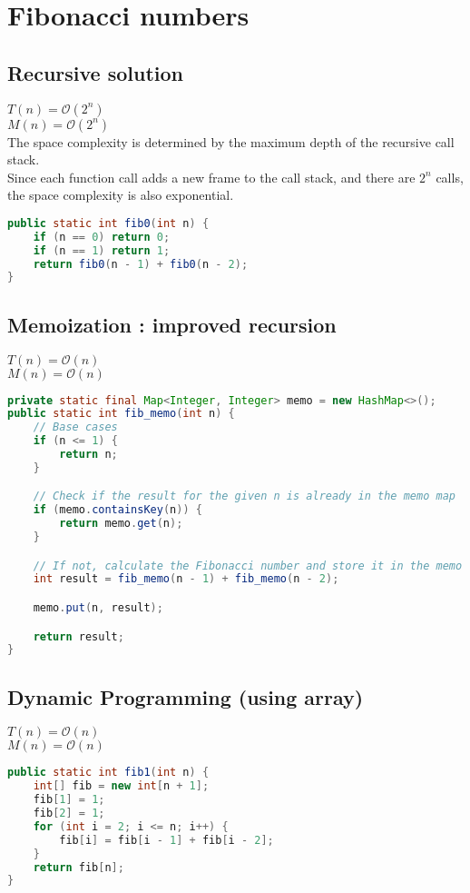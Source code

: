 \documentclass{article}
\begin{document}
\section{Fibonacci numbers}
\subsection{Recursive solution}
$T(n) = \mathcal{O}(2^{n})$ \\
$M(n) = \mathcal{O}(2^{n})$ \\
The space complexity is determined by the maximum depth of the recursive call stack.\\
Since each function call adds a new frame to the call stack, and there are $2^n$ calls, the space complexity is also exponential.\\
\begin{lstlisting}[language=Java]
public static int fib0(int n) {
	if (n == 0) return 0;
	if (n == 1) return 1;
	return fib0(n - 1) + fib0(n - 2);
}
\end{lstlisting}

\subsection{Memoization : improved recursion}
$T(n) = \mathcal{O}(n)$ \\
$M(n) = \mathcal{O}(n)$ \\
\newpage
\begin{lstlisting}[float=h, language=Java]
private static final Map<Integer, Integer> memo = new HashMap<>();
public static int fib_memo(int n) {
	// Base cases
	if (n <= 1) {
		return n;
	}

	// Check if the result for the given n is already in the memo map
	if (memo.containsKey(n)) {
		return memo.get(n);
	}

	// If not, calculate the Fibonacci number and store it in the memo map
	int result = fib_memo(n - 1) + fib_memo(n - 2);

	memo.put(n, result);

	return result;
}
\end{lstlisting}

\subsection{Dynamic Programming (using array)}
$T(n) = \mathcal{O}(n)$ \\
$M(n) = \mathcal{O}(n)$ \\
\begin{lstlisting}[language=Java]
public static int fib1(int n) {
	int[] fib = new int[n + 1];
	fib[1] = 1;
	fib[2] = 1;
	for (int i = 2; i <= n; i++) {
		fib[i] = fib[i - 1] + fib[i - 2];
	}
	return fib[n];
}
\end{lstlisting}
\end{document}
